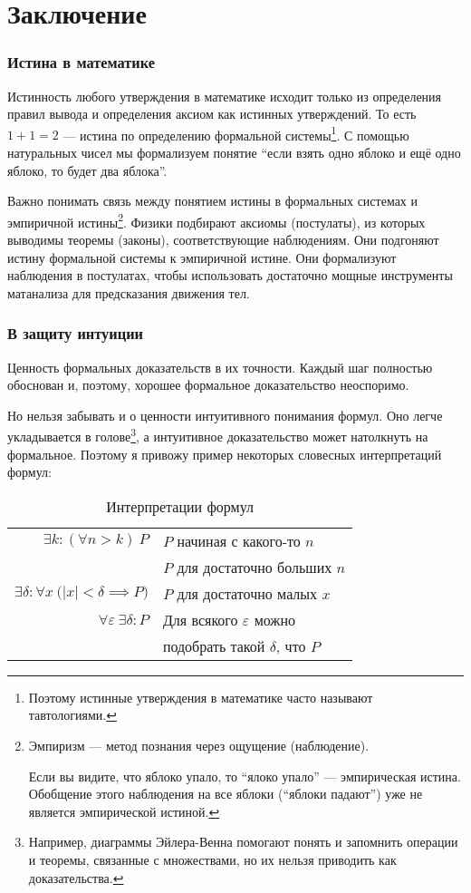 \part{Заключение}

\section{Истина в математике}

Истинность любого утверждения в математике исходит только из определения правил
вывода и определения аксиом как истинных утверждений.
То есть $1+1=2$ --- истина по определению формальной системы\footnote{
	Поэтому истинные утверждения в математике часто называют тавтологиями.}.
С помощью натуральных чисел мы формализуем понятие ``если взять одно яблоко
и ещё одно яблоко, то будет два яблока''.

Важно понимать связь между понятием истины в формальных системах
и эмпиричной истины\footnote{Эмпиризм --- метод познания через ощущение (наблюдение).

Если вы видите, что яблоко упало, то ``ялоко упало'' --- эмпирическая истина.
Обобщение этого наблюдения на все яблоки (``яблоки падают'') уже не является
эмпирической истиной.}.
Физики подбирают аксиомы (постулаты),
из которых выводимы теоремы (законы), соответствующие наблюдениям.
Они подгоняют истину формальной системы к эмпиричной истине.
Они формализуют наблюдения в постулатах, чтобы использовать достаточно мощные
инструменты матанализа для предсказания движения тел.

\section{В защиту интуиции}

Ценность формальных доказательств в их точности. Каждый шаг полностью обоснован и,
поэтому, хорошее формальное доказательство неоспоримо.

Но нельзя забывать и о ценности интуитивного понимания формул.
Оно легче укладывается в голове\footnote{Например, диаграммы
Эйлера-Венна помогают понять и запомнить операции и теоремы, связанные с
множествами, но их нельзя приводить как доказательства.},
а интуитивное доказательство может натолкнуть на формальное. Поэтому я привожу пример
некоторых словесных интерпретаций формул:
\begin{table}
	\centering
	\begin{tabular}{r|l}
		$\exists k:(\forall n>k)~P$     & $P$ начиная с какого-то $n$       \\
		& $P$ для достаточно больших $n$    \\[1em]
		$\exists \delta:\forall x~
		\big(|x|<\delta\implies P\big)$ & $P$ для достаточно малых $x$      \\[1em]
		$\forall \varepsilon~
		\exists \delta:P$               & Для всякого $\varepsilon$ можно   \\
		& подобрать такой $\delta$, что $P$
	\end{tabular}
	\caption{Интерпретации формул}\label{table:formula_interp}
\end{table}


